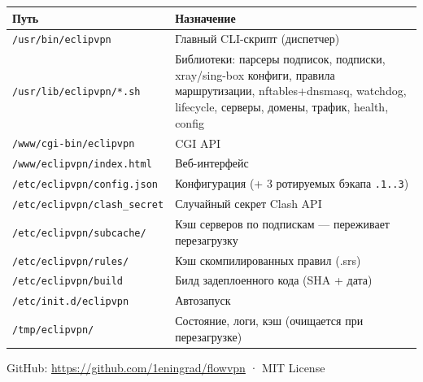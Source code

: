 \documentclass[11pt,a4paper]{article}
\begin{document}
\begin{tabularx}{\textwidth}{l X}
\toprule
\textbf{Путь} & \textbf{Назначение} \\
\midrule
\texttt{/usr/bin/eclipvpn} & Главный CLI-скрипт (диспетчер) \\
\texttt{/usr/lib/eclipvpn/*.sh} & Библиотеки: парсеры подписок, подписки, xray/sing-box конфиги, правила маршрутизации, nftables+dnsmasq, watchdog, lifecycle, серверы, домены, трафик, health, config \\
\texttt{/www/cgi-bin/eclipvpn} & CGI API \\
\texttt{/www/eclipvpn/index.html} & Веб-интерфейс \\
\texttt{/etc/eclipvpn/config.json} & Конфигурация (+ 3 ротируемых бэкапа \texttt{.1..3}) \\
\texttt{/etc/eclipvpn/clash\_secret} & Случайный секрет Clash API \\
\texttt{/etc/eclipvpn/subcache/} & Кэш серверов по подпискам --- переживает перезагрузку \\
\texttt{/etc/eclipvpn/rules/} & Кэш скомпилированных правил (.srs) \\
\texttt{/etc/eclipvpn/build} & Билд задеплоенного кода (SHA + дата) \\
\texttt{/etc/init.d/eclipvpn} & Автозапуск \\
\texttt{/tmp/eclipvpn/} & Состояние, логи, кэш (очищается при перезагрузке) \\
\bottomrule
\end{tabularx}

\vfill
\begin{center}
\small\color{gray}
GitHub: \url{https://github.com/1eningrad/flowvpn} · MIT License
\end{center}
\end{document}
